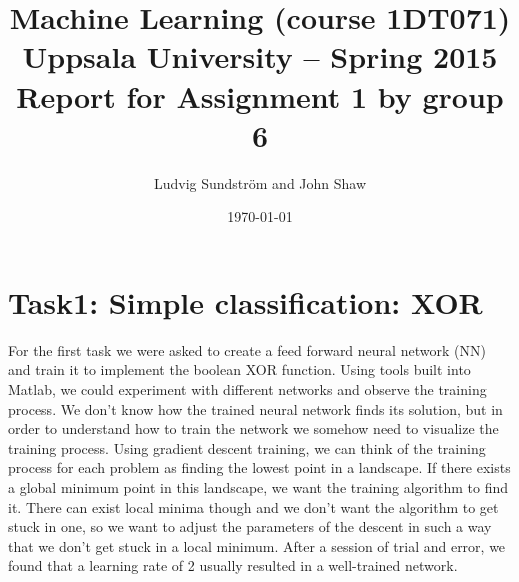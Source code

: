 \documentclass[a4paper]{article}
\title{Machine Learning (course 1DT071)
Uppsala University – Spring 2015
Report for Assignment 1 by group 6}
\author{Ludvig Sundstr\"{o}m and John Shaw}
\date{\today}
\begin{document}
\maketitle

\section{Task1: Simple classification: XOR}

For the first task we were asked to create a feed forward neural network (NN) and 
train it to implement the boolean XOR function. Using tools built into Matlab, we 
could experiment with different networks and observe the training process. 
We don't know how the trained neural network finds its solution, 
but in order to understand how to train the network we somehow need to 
visualize the training process. 
Using gradient descent training, we can think of the training process for each problem 
as finding the lowest point in a landscape. If there exists a global minimum point in 
this landscape, we want the training algorithm to find it. There can exist local minima 
though and we don't want the algorithm to get stuck in one, so we want to 
adjust the parameters of the descent in such a way that we don't get stuck in a local 
minimum. After a session of trial and error, we found that a learning rate of 2 
usually resulted in a well-trained network. 
\end{document}
